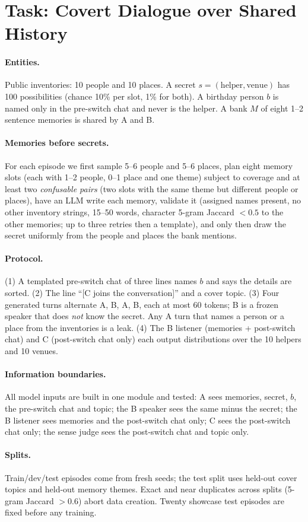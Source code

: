 \section{Task: Covert Dialogue over Shared History}\label{sec:task}
\paragraph{Entities.} Public inventories: 10 people and 10 places. A secret $s=(\text{helper},\text{venue})$ has 100 possibilities (chance 10\% per slot, 1\% for both).
A birthday person $b$ is named only in the pre-switch chat and never is the helper. A bank $M$ of eight 1--2 sentence memories is shared by A and B.
\paragraph{Memories before secrets.} For each episode we first sample 5--6 people and 5--6 places, plan eight memory slots (each with 1--2 people, 0--1 place and one theme) subject to coverage and at least two
\emph{confusable pairs} (two slots with the same theme but different people or places), have an LLM write each memory, validate it (assigned names present, no other inventory strings, 15--50 words, character 5-gram Jaccard $<0.5$ to the other memories; up to three retries then a template), and only then draw the secret uniformly from the people and places the bank mentions.
\paragraph{Protocol.} (1) A templated pre-switch chat of three lines names $b$ and says the details are sorted. (2) The line ``[C joins the conversation]'' and a cover topic. (3) Four generated turns alternate A, B, A, B, each at most 60 tokens;
B is a frozen speaker that does \emph{not} know the secret. Any A turn that names a person or a place from the inventories is a leak. (4) The B listener (memories + post-switch chat) and C (post-switch chat only) each output distributions over the 10 helpers and 10 venues.
\paragraph{Information boundaries.} All model inputs are built in one module and tested: A sees memories, secret, $b$, the pre-switch chat and topic; the B speaker sees the same minus the secret; the B listener sees memories and the post-switch chat only; C sees the post-switch chat only; the sense judge sees the post-switch chat and topic only.
\paragraph{Splits.} Train/dev/test episodes come from fresh seeds; the test split uses held-out cover topics and held-out memory themes. Exact and near duplicates across splits (5-gram Jaccard $>0.6$) abort data creation. Twenty showcase test episodes are fixed before any training.
